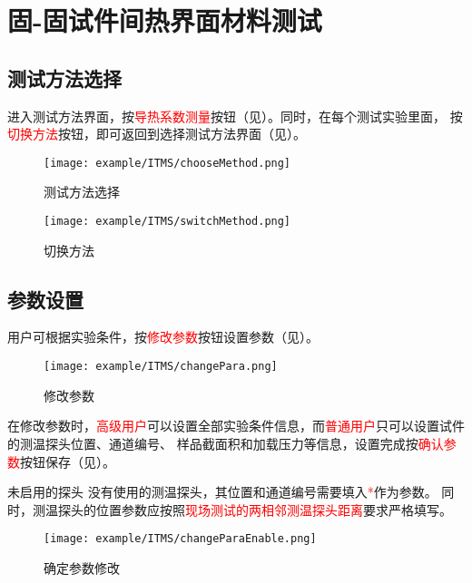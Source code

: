 \section{固-固试件间热界面材料测试}
\subsection{测试方法选择}
进入测试方法界面，按\textcolor{red}{导热系数测量}按钮（见）。同时，在每个测试实验里面，
按\textcolor{red}{切换方法}按钮，即可返回到选择测试方法界面（见）。
\begin{figure}[H]
	\centering
	\texttt{[image: example/ITMS/chooseMethod.png]}
	\caption{ 测试方法选择 \label{fig:exmp_itms_chooseMethod}}
\end{figure}

\begin{figure}[H]
	\centering
	\texttt{[image: example/ITMS/switchMethod.png]}
	\caption{ 切换方法 \label{fig:exmp_itms_switchMethod}}
\end{figure}

\subsection{参数设置}
用户可根据实验条件，按\textcolor{red}{修改参数}按钮设置参数（见）。
\begin{figure}[H]
	\centering
	\texttt{[image: example/ITMS/changePara.png]}
	\caption{ 修改参数 \label{fig:exmp_itms_changePara}}
\end{figure}
在修改参数时，\textcolor{red}{高级用户}可以设置全部实验条件信息，而\textcolor{red}{普通用户}只可以设置试件的测温探头位置、通道编号、
样品截面积和加载压力等信息，设置完成按\textcolor{red}{确认参数}按钮保存（见）。
\begin{tips}{未启用的探头}
没有使用的测温探头，其位置和通道编号需要填入\textcolor{red}{*}作为参数。
同时，测温探头的位置参数应按照\textcolor{red}{现场测试的两相邻测温探头距离}要求严格填写。
\end{tips}
\begin{figure}[H]
	\centering
	\texttt{[image: example/ITMS/changeParaEnable.png]}
	\caption{ 确定参数修改 \label{fig:exmp_itms_changeParaEnable}}
\end{figure}
